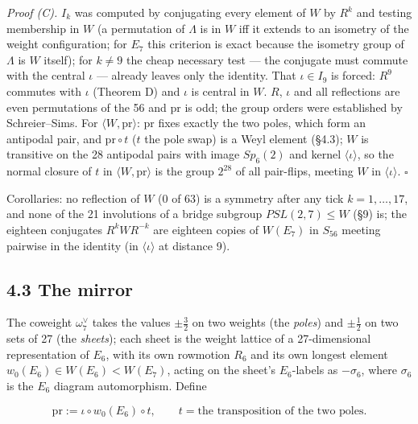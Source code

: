 \documentclass[
]{article}
\newcounter{none} %
\begin{document}
\emph{Proof (C).} \(I_k\) was computed by conjugating every element of
\(W\) by \(R^k\) and testing membership in \(W\) (a permutation of
\(\Lambda\) is in \(W\) iff it extends to an isometry of the weight
configuration; for \(E_7\) this criterion is exact because the isometry
group of \(\Lambda\) is \(W\) itself); for \(k \ne 9\) the cheap
necessary test --- the conjugate must commute with the central \(\iota\)
--- already leaves only the identity. That \(\iota \in I_9\) is forced:
\(R^9\) commutes with \(\iota\) (Theorem D) and \(\iota\) is central in
\(W\). \(R\), \(\iota\) and all reflections are even permutations of the
56 and \(\mathrm{pr}\) is odd; the group orders were established by
Schreier--Sims. For \(\langle W, \mathrm{pr} \rangle\): \(\mathrm{pr}\)
fixes exactly the two poles, which form an antipodal pair, and
\(\mathrm{pr} \circ t\) (\(t\) the pole swap) is a Weyl element (§4.3);
\(W\) is transitive on the 28 antipodal pairs with image \(Sp_6(2)\) and
kernel \(\langle\iota\rangle\), so the normal closure of \(t\) in
\(\langle W, \mathrm{pr} \rangle\) is the group \(2^{28}\) of all
pair-flips, meeting \(W\) in \(\langle \iota \rangle\). \(\square\)

Corollaries: no reflection of \(W\) (0 of 63) is a symmetry after any
tick \(k = 1, \dots, 17\), and none of the 21 involutions of a bridge
subgroup \(PSL(2,7) \le W\) (§9) is; the eighteen conjugates
\(R^kWR^{-k}\) are eighteen copies of \(W(E_7)\) in \(S_{56}\) meeting
pairwise in the identity (in \(\langle\iota\rangle\) at distance 9).

\subsection{4.3 The mirror}\label{the-mirror}

The coweight \(\omega_7^\vee\) takes the values \(\pm\tfrac32\) on two
weights (the \emph{poles}) and \(\pm\tfrac12\) on two sets of 27 (the
\emph{sheets}); each sheet is the weight lattice of a 27-dimensional
representation of \(E_6\), with its own rowmotion \(R_6\) and its own
longest element \(w_0(E_6) \in W(E_6) < W(E_7)\), acting on the sheet's
\(E_6\)-labels as \(-\sigma_6\), where \(\sigma_6\) is the \(E_6\)
diagram automorphism. Define

\[\mathrm{pr} := \iota \circ w_0(E_6) \circ t, \qquad t = \text{the transposition of the two poles}.\]
\end{document}
